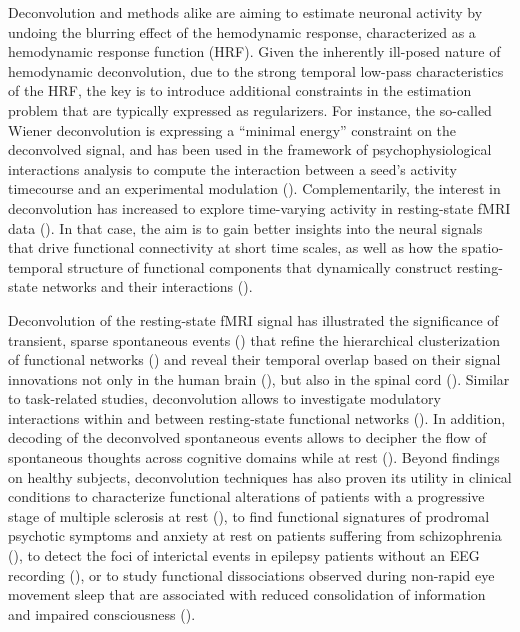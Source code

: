 Deconvolution and methods alike are aiming to estimate neuronal activity by undoing the blurring effect of the hemodynamic response, characterized as a hemodynamic response function (HRF). Given the inherently ill-posed nature of hemodynamic deconvolution, due to the strong temporal low-pass characteristics of the HRF, the key is to introduce additional constraints in the estimation problem that are typically expressed as regularizers. For instance, the so-called Wiener deconvolution is expressing a ``minimal energy'' constraint on the deconvolved signal, and has been used in the framework of psychophysiological interactions analysis to compute the interaction between a seed's activity timecourse and an experimental modulation (\citealt{glover1999deconvolution,gitelman2003ModelingRegionalPsychophysiologic,Di2019,Gerchen2014,Freitas2020}). Complementarily, the interest in deconvolution has increased to explore time-varying activity in resting-state fMRI data (\citealt{Bolton2020,Preti2017,Keilholz2017,Lurie2020}). In that case, the aim is to gain better insights into the neural signals that drive functional connectivity at short time scales, as well as how the spatio-temporal structure of functional components that dynamically construct resting-state networks and their interactions (\citealt{karahanoglu2017DynamicsLargescalefMRI}).

Deconvolution of the resting-state fMRI signal has illustrated the significance of transient, sparse spontaneous events (\citealt{petridou2013PeriodsRestfMRI,allan2015FunctionalConnectivityMRI}) that refine the hierarchical clusterization of functional networks (\citealt{karahanoglu2013TotalActivationfMRI}) and reveal their temporal overlap based on their signal innovations not only in the human brain (\citealt{karahanoglu2015TransientBrainActivity}), but also in the spinal cord (\citealt{kinany2020DynamicFunctionalConnectivity}). Similar to task-related studies, deconvolution allows to investigate modulatory interactions within and between resting-state functional networks (\citealt{Di2013,Di2015}). In addition, decoding of the deconvolved spontaneous events allows to decipher the flow of spontaneous thoughts across cognitive domains while at rest (\citealt{gonzalez-castillo2019ImagingSpontaneousFlow,karahanoglu2015TransientBrainActivity}). Beyond findings on healthy subjects, deconvolution techniques has also proven its utility in clinical conditions to characterize functional alterations of patients with a progressive stage of multiple sclerosis at rest (\citealt{bommarito2020FunctionalNetworkDynamicsa}), to find functional signatures of prodromal psychotic symptoms and anxiety at rest on patients suffering from schizophrenia (\citealt{zoller2019LargeScaleBrainNetwork}), to detect the foci of interictal events in epilepsy patients without an EEG recording (\citealt{lopes2012DetectionEpilepticActivity,karahanouglu2013spatial}), or to study functional dissociations observed during non-rapid eye movement sleep that are associated with reduced consolidation of information and impaired consciousness (\citealt{tarun2021NREMSleepStagesa}).


